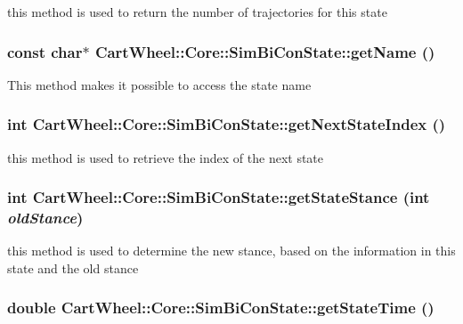 \label{classCartWheel_1_1Core_1_1SimBiConState_a694c5a6d1749c347bec9e0b9009aa7ad}
this method is used to return the number of trajectories for this state \hypertarget{classCartWheel_1_1Core_1_1SimBiConState_aff254953264318a20a9ce1270d518ec0}{
\subsubsection[{getName}]{\setlength{\rightskip}{0pt plus 5cm}const char$\ast$ CartWheel::Core::SimBiConState::getName ()}}
\label{classCartWheel_1_1Core_1_1SimBiConState_aff254953264318a20a9ce1270d518ec0}
This method makes it possible to access the state name \hypertarget{classCartWheel_1_1Core_1_1SimBiConState_a662f967377a1a13c3e9dd6c0fd6384b6}{
\subsubsection[{getNextStateIndex}]{\setlength{\rightskip}{0pt plus 5cm}int CartWheel::Core::SimBiConState::getNextStateIndex ()}}
\label{classCartWheel_1_1Core_1_1SimBiConState_a662f967377a1a13c3e9dd6c0fd6384b6}
this method is used to retrieve the index of the next state \hypertarget{classCartWheel_1_1Core_1_1SimBiConState_ab81b0c4bfacfc47ea89f38b317fa87cc}{
\subsubsection[{getStateStance}]{\setlength{\rightskip}{0pt plus 5cm}int CartWheel::Core::SimBiConState::getStateStance (int {\em oldStance})}}
\label{classCartWheel_1_1Core_1_1SimBiConState_ab81b0c4bfacfc47ea89f38b317fa87cc}
this method is used to determine the new stance, based on the information in this state and the old stance \hypertarget{classCartWheel_1_1Core_1_1SimBiConState_a1af7171d7a15d9dbf166f69b927eee6d}{
\subsubsection[{getStateTime}]{\setlength{\rightskip}{0pt plus 5cm}double CartWheel::Core::SimBiConState::getStateTime ()}}
